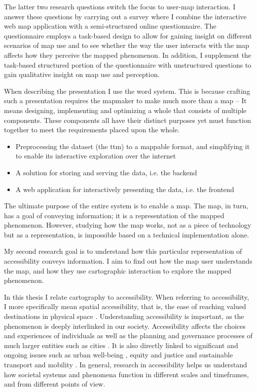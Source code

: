 The latter two research questions switch the focus to user-map interaction.
I answer these questions by carrying out a survey
where I combine the interactive web map application with
a semi-structured online questionnaire.
The questionnaire employs a task-based design
to allow for gaining insight on different scenarios of map use
and to see whether the way the user interacts with the map
affects how they perceive the mapped phenomenon.
In addition, I supplement the task-based structured portion of the questionnaire
with unstructured questions to gain qualitative insight on map use and perception.



When describing the presentation I use the word system.
This is because crafting such a presentation
requires the mapmaker to make much more than a map --
It means designing, implementing and optimizing
a whole that consists of multiple components.
These components all have their distinct purposes yet must function together
to meet the requirements placed upon the whole.
\begin{itemize}
	\item Preprocessing the dataset (the \acrshort{ttm}) to a mappable format,
	and simplifying it to enable its interactive exploration over the internet
	\item A solution for storing and serving the data, i.e. the backend
	\item A web application for interactively presenting the data, i.e. the frontend
\end{itemize}

The ultimate purpose of the entire system is to enable a map.
The map, in turn, has a goal of conveying information;
it is a representation of the mapped phenomenon.
However, studying how the map works,
not as a piece of technology but as a representation,
is impossible based on a technical implementation alone.

My second research goal is to understand how
this particular representation of accessibility conveys information.
I aim to find out how the map user understands the map,
and how they use cartographic interaction to explore the mapped phenomenon.

In this thesis I relate cartography to accessibility.
When referring to accessibility,
I more specifically mean spatial accessibility, that is,
the ease of reaching valued destinations in physical space \parencite{lev2020}.
Understanding accessibility is important,
as the phenomenon is deeply interlinked in our society.
Accessibility affects the choices and experiences of individuals \parencite{kwa1998, kwa2003}
as well as the planning and governance processes
of much larger entities such as cities \parencite{cur2010, low2015}.
It is also directly linked to significant and ongoing issues such as
urban well-being \parencite{zha2011},
equity and justice \parencite{per2017, che2020}
and sustainable transport and mobility \parencite{son2017, mah2019}.
In general, research in accessibility helps us understand
how societal systems and phenomena function
in different scales and timeframes, and from different points of view.

